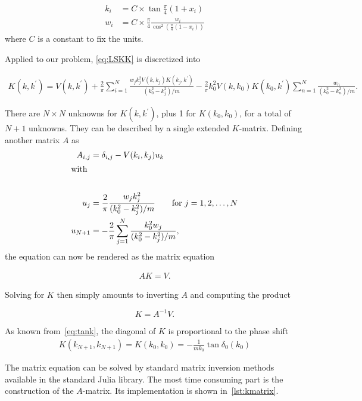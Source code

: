 \begin{align*}
  k_{i} &= C\times \tan{\frac{\pi}{4}(1+x_{i})}\\
  w_{i} &= C\times \frac{\pi}{4}\frac{w_{i}}{\cos^{2}\left( \frac{\pi}{4}(1-x_{i}) \right)}
\end{align*}
where \(C\) is a constant to fix the units.

Applied to our problem, \eqref{eq:LSKK} is discretized into

\begin{align*}
  K(k, k^{\prime}) = V(k, k^{\prime}) + \frac{2}{\pi}\sum_{i=1}^{N}
  \frac{w_{j}k_{j}^{2}V(k, k_{j})K(k_{j},k^{\prime})}{(k_{0}^{2}-k_{j}^{2})/m}
  - \frac{2}{\pi}k_{0}^{2}V(k, k_{0})K(k_{0},k^{\prime})\sum_{n=1}^{N}
  \frac{w_{n}}{(k_{0}^{2}-k_{n}^{2})/m}.
\end{align*}

There are \(N\times N\) unknowns for \(K(k, k^{\prime})\), plus 1 for \(K(k_{0},
k_{0})\), for a total of \(N+1\) unknowns. They can be described by a single
extended \(K\)-matrix. Defining another matrix \(A\) as
\begin{align*}
  A_{i,j} &= \delta_{i,j} - V(k_{i}, k_{j})u_{k}\\
  \intertext{with}\\
            u_{j} &= \frac{2}{\pi} \frac{w_{j}k_{j}^{2}}{(k_{0}^{2}-k_{j}^{2})/m}
                    \qquad \text{for } j = 1, 2, \ldots, N \\
  u_{N+1} &= - \frac{2}{\pi}\sum_{j=1}^{N}\frac{k_{0}^{2}w_{j}}{(k_{0}^{2}-k_{j}^{2})/m},
\end{align*}
the equation can now be rendered as the matrix equation

\begin{align*}
  AK = V.
\end{align*}

Solving for \(K\) then simply amounts to inverting \(A\) and computing the
product

\begin{equation}
  K = A^{-1}V.\label{eq:matrixeq}
\end{equation}

As known from~\eqref{eq:tank}, the diagonal of \(K\) is proportional to the phase shift
\begin{align*}
  K(k_{N+1}, k_{N+1}) = K(k_{0}, k_{0}) = -\frac{1}{mk_{0}}\tan\delta_{0}(k_{0})
\end{align*}

The matrix equation can be solved by standard matrix inversion methods available
in the standard Julia library. The most time consuming part is the construction
of the \(A\)-matrix. Its implementation is shown in~\cref{lst:kmatrix}.

